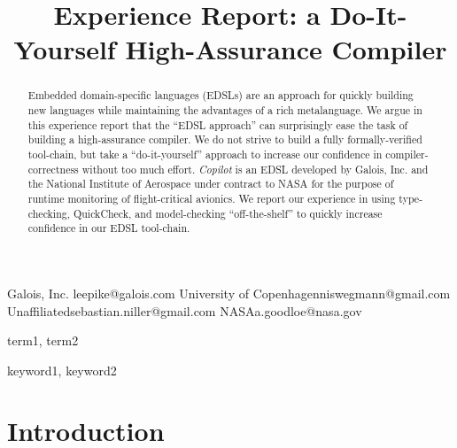 \documentclass[preprint]{sigplanconf}
\begin{document}
\copyrightdata{[to be supplied]} 


\title{Experience Report: a Do-It-Yourself High-Assurance Compiler}

           {Galois, Inc.}
           {leepike@galois.com}
           {University of Copenhagen}{niswegmann@gmail.com}
           {Unaffiliated}{sebastian.niller@gmail.com}
           {NASA}{a.goodloe@nasa.gov}
\maketitle

\begin{abstract}
Embedded domain-specific languages (EDSLs) are an approach for quickly building
new languages while maintaining the advantages of a rich metalanguage.  We argue
in this experience report that the ``EDSL approach'' can surprisingly ease the
task of building a high-assurance compiler.  We do not strive to build a fully
formally-verified tool-chain, but take a ``do-it-yourself'' approach to increase
our confidence in compiler-correctness without too much effort.  \emph{Copilot}
is an EDSL developed by Galois, Inc. and the National Institute of Aerospace
under contract to NASA for the purpose of runtime monitoring of flight-critical
avionics.  We report our experience in using type-checking, QuickCheck, and
model-checking ``off-the-shelf'' to quickly increase confidence in our EDSL
tool-chain.
\end{abstract}


\terms
term1, term2

\keywords
keyword1, keyword2





\section{Introduction}\label{sec:intro}
\end{document}
